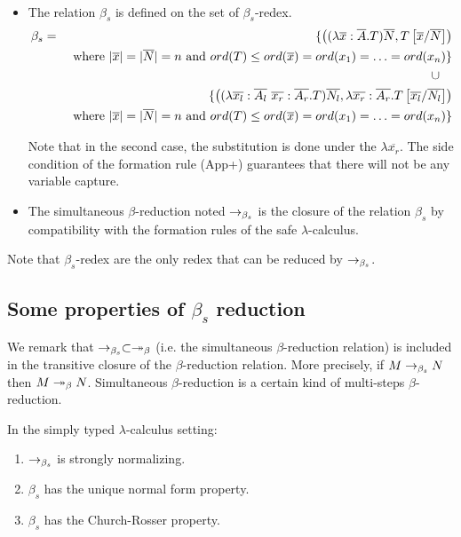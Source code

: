 \begin{dfn} \
\begin{itemize}
\item The relation $\beta_s$ is defined on the set of $\beta_s$-redex.
\begin{eqnarray*}
\beta_s &=&
 \{  \left( (\lambda \overline{x} : \overline{A} . T) \overline{N}, T\left[ \overline{x}/\overline{N} \right] \right) \\
&& \mbox{ where }
     |\overline{x}| = |\overline{N}| = n \mbox{ and } ord(T) \leq ord(\overline{x}) = ord(x_1) = \ldots = ord(x_n)
\} \\
 && \cup \quad \\
&& \{
    \left( (\lambda \overline{x_l} : \overline{A_l} \  \overline{x_r}: \overline{A_r} . T) \overline{N_l}, \lambda \overline{x_r}: \overline{A_r} . T\left[ \overline{x_l}/\overline{N_l} \right] \right) \\
&& \mbox{ where }
 |\overline{x}| = |\overline{N}| = n \mbox{ and } ord(T) \leq ord(\overline{x}) = ord(x_1) = \ldots = ord(x_n)
\}
\end{eqnarray*}

Note that in the second case, the substitution is done under the
$\lambda \overline{x_r}$. The side condition of the formation rule
(App+) guarantees that there will not be any variable capture.

\item
The simultaneous $\beta$-reduction noted $\rightarrow_{\beta_s}$ is the closure
of the relation $\beta_s$ by compatibility with the formation rules
of the safe $\lambda$-calculus.
\end{itemize}
\end{dfn}

Note that $\beta_s$-redex are the only redex that can be reduced by
$\rightarrow_{\beta_s}$.




\subsection{Some properties of $\beta_s$ reduction}

We remark that $\rightarrow_{\beta_s} \subset \twoheadrightarrow_\beta$ (i.e. the simultaneous
$\beta$-reduction relation) is included in the transitive closure of
the $\beta$-reduction relation. More precisely, if $M \rightarrow_{\beta_s} N$
then $M \twoheadrightarrow_\beta N$. Simultaneous $\beta$-reduction is a certain
kind of multi-steps $\beta$-reduction.

\begin{lem} In the simply typed $\lambda$-calculus setting:
\begin{enumerate}
\item $\rightarrow_{\beta_s}$ is strongly normalizing.
\item $\beta_s$ has the unique normal form property.
\item $\beta_s$ has the Church-Rosser property.
\end{enumerate}
\end{lem}

